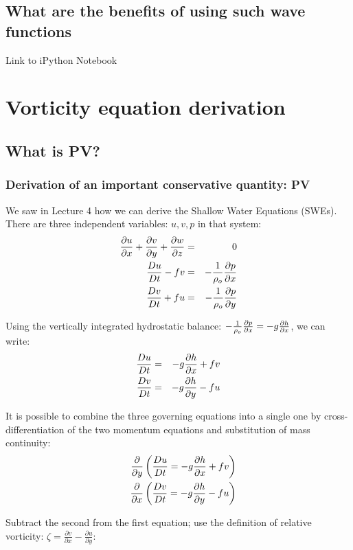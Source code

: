 \section{What are the benefits of using such wave functions}
Link to iPython Notebook

\vspace{1em} 


\chapter{Vorticity equation derivation}

\section{What is PV?}

\subsection{Derivation of an important conservative quantity: PV}

We saw in Lecture 4 how we can derive the Shallow Water Equations (SWEs). There are three independent variables: $u,v,p$ in that system:
\begin{eqnarray}
	\frac{\partial u}{\partial x}+\frac{\partial v}{\partial y}+\frac{\partial w}{\partial z} & = & 0 \\
	\frac{D u}{D t}-fv & = & -\frac{1}{\rho_o}\frac{\partial p}{\partial x} \\
	\frac{D v}{D t}+fu & = & -\frac{1}{\rho_o}\frac{\partial p}{\partial y}
\end{eqnarray}

Using the vertically integrated hydrostatic balance: $-\frac{1}{\rho_o} \frac{\partial p}{\partial x} = -g \frac{\partial h}{\partial x}$, we can write: 
\begin{eqnarray}
	\frac{D u}{D t} & = & -g\frac{\partial h}{\partial x} +fv\\
	\frac{D v}{D t} & = & -g\frac{\partial h}{\partial y} -fu
\end{eqnarray}

It is possible to combine the three governing equations into a single one by cross-differentiation of the two momentum equations and substitution of mass continuity:
\begin{eqnarray}
	&&\frac{\partial}{\partial y} \left( \frac{D u}{D t} = -g\frac{\partial h}{\partial x} +fv \right) \\
	&&\frac{\partial}{\partial x} \left( \frac{D v}{D t} = -g\frac{\partial h}{\partial y} -fu \right) 
\end{eqnarray}

Subtract the second from the first equation; use the definition of relative vorticity: $\zeta = \frac{\partial v}{\partial x} - \frac{\partial u}{\partial y}$:

